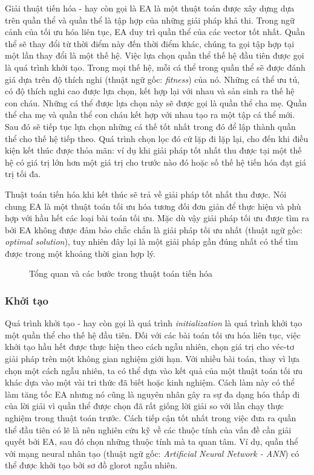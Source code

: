 \label{subsection:ea-continuous}
Giải thuật tiến hóa - hay còn gọi là EA là một thuật toán được xây dựng dựa trên quần thể và quần thể là tập hợp của những giải pháp khả thi. Trong ngữ cảnh của tối ưu hóa liên tục, EA duy trì quần thể của các vector tốt nhất. Quần thể sẽ thay đổi từ thời điểm này đến thời điểm khác, chúng ta gọi tập hợp tại một lần thay đổi là một thế hệ. Việc lựa chọn quần thể thế hệ đầu tiên được gọi là quá trình khởi tạo. Trong mọi thế hệ, mỗi cá thể trong quần thể sẽ được đánh giá dựa trên độ thích nghi (thuật ngữ gốc: \emph{fitness}) của nó. Những cá thể ưu tú, có độ thích nghi cao được lựa chọn, kết hợp lại với nhau và sản sinh ra thế hệ con cháu. Những cá thể được lựa chọn này sẽ được gọi là quần thể cha mẹ. Quần thể cha mẹ và quần thể con cháu kết hợp với nhau tạo ra một tập cá thể mới. Sau đó sẽ tiếp tục lựa chọn những cá thế tốt nhất trong đó để lập thành quần thể cho thế hệ tiếp theo. Quá trình chọn lọc đó cứ lặp đi lặp lại, cho đến khi điều kiện kết thúc được thỏa mãn: ví dụ khi giải pháp tốt nhất thu được tại một thế hệ có giá trị lớn hơn một giá trị cho trước nào đó hoặc số thế hệ tiến hóa đạt giá trị tối đa.

Thuật toán tiến hóa khi kết thúc sẽ trả về giải pháp tốt nhất thu được. Nói chung EA là một thuật toán tối ưu hóa tương đối đơn giản để thực hiện và phù hợp với hầu hết các loại bài toán tối ưu. Mặc dù vậy giải pháp tối ưu được tìm ra bởi EA không được đảm bảo chắc chắn là giải pháp tối ưu nhất (thuật ngữ gốc: \emph{optimal solution}), tuy nhiên đây lại là một giải pháp gần đúng nhất có thể tìm được trong một khoảng thời gian hợp lý.
\begin{figure}[ht]
    \centering
    \caption{Tổng quan và các bước trong thuật toán tiến hóa}
    \label{fig:ea}
\end{figure}
\subsubsection{Khởi tạo}
 Quá trình khởi tạo - hay còn gọi là quá trình \textit{initialization} là quá trình khởi tạo một quần thể cho thế hệ đầu tiên. Đối với các bài toán tối ưu hóa liên tục, việc khởi tạo hầu hết được thực hiện theo cách ngẫu nhiên, chọn giá trị cho véc-tơ giải pháp trên một không gian nghiệm giới hạn. Với nhiều bài toán, thay vì lựa chọn một cách ngẫu nhiên, ta có thể dựa vào kết quả của một thuật toán tối ưu khác dựa vào một vài tri thức đã biết hoặc kinh nghiệm. Cách làm này có thể làm tăng tốc EA nhưng nó cũng là nguyên nhân gây ra sự đa dạng hóa thấp đi của lời giải vì quần thể được chọn đã rất giống lời giải so với lần chạy thực nghiệm trong thuật toán trước.
 Cách tiếp cận tốt nhất trong việc đưa ra quần thể đầu tiên có lẽ là nên nghiên cứu kỹ về các thuộc tính của vấn đề cần giải quyết bởi EA, sau đó chọn những thuộc tính mà ta quan tâm. Ví dụ, quần thể với mạng neural nhân tạo (thuật ngữ gốc: \emph{Artificial Neural Network - ANN}) có thể được khởi tạo bởi sơ đồ glorot ngẫu nhiên. \cite{glorot2010understanding}
